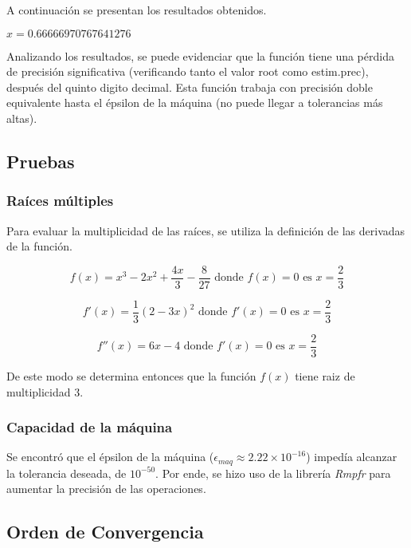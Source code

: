 \documentclass[a4paper,12pt]{article}
\begin{document}
A continuación se presentan los resultados obtenidos. \par

\vspace{1em}
$x=0.66666970767641276$
\vspace{1em}

Analizando los resultados, se puede evidenciar que la función tiene una pérdida de precisión significativa (verificando tanto el valor root como estim.prec), después del quinto digito decimal. Esta función trabaja con precisión doble equivalente hasta el épsilon de la máquina (no puede llegar a tolerancias más altas). \par

\newpage

\subsection{Pruebas}

\subsubsection{Raíces múltiples}

Para evaluar la multiplicidad de las raíces, se utiliza la definición de las derivadas de la función.

\[ f(x)=x^3 -2x^2 + \frac{4x}{3} -\frac{8}{27} \textrm{ donde } f(x)=0 \textrm{ es } x = \frac{2}{3} \]

\[ f'(x)=\frac{1}{3}(2-3x)^2 \textrm{ donde } f'(x)=0 \textrm{ es } x = \frac{2}{3} \]

\[ f''(x)=6x-4 \textrm{ donde } f'(x)=0 \textrm{ es } x = \frac{2}{3} \]

De este modo se determina entonces que la función $f(x)$ tiene raiz de multiplicidad 3. \par

\subsubsection{Capacidad de la máquina}

Se encontró que el épsilon de la máquina ($\epsilon_{maq} \approx 2.22 \times 10^{-16}$) impedía alcanzar la tolerancia deseada, de $10^{-50}$. Por ende, se hizo uso de la librería \emph{Rmpfr} para aumentar la precisión de las operaciones. \par 

\newpage 

\subsection{Orden de Convergencia}
\end{document}
